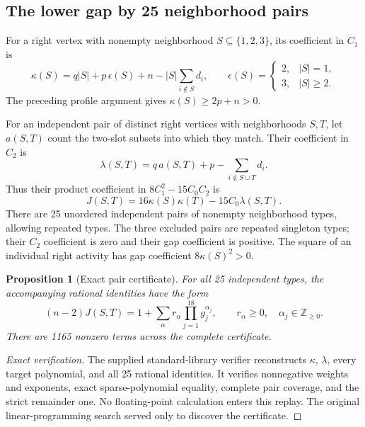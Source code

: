 \documentclass[11pt,a4paper]{article}
\newtheorem{proposition}[theorem]{Proposition}
\theoremstyle{remark}\newtheorem{remark}[theorem]{Remark}
\begin{document}
\subsection{The lower gap by 25 neighborhood pairs}
For a right vertex with nonempty neighborhood $S\subseteq\{1,2,3\}$, its coefficient in $C_1$ is
\begin{equation}\label{mrn:e:mh:eq:kappa}
 \kappa(S)=q|S|+p\,\epsilon(S)+n-|S|\sum_{i\notin S}d_i,
 \qquad
 \epsilon(S)=
 \begin{cases}2,&|S|=1,\\3,&|S|\ge2.\end{cases}
\end{equation}
The preceding profile argument gives $\kappa(S)\ge2p+n>0$.

For an independent pair of distinct right vertices with neighborhoods $S,T$, let $a(S,T)$ count the two-slot subsets into which they match. Their coefficient in $C_2$ is
\[
 \lambda(S,T)=q\,a(S,T)+p-\sum_{i\notin S\cup T}d_i.
\]
Thus their product coefficient in $8C_1^2-15C_0C_2$ is
\begin{equation}\label{mrn:e:mh:eq:J}
 J(S,T)=16\kappa(S)\kappa(T)-15C_0\lambda(S,T).
\end{equation}
There are 25 unordered independent pairs of nonempty neighborhood types, allowing repeated types. The three excluded pairs are repeated singleton types; their $C_2$ coefficient is zero and their gap coefficient is positive. The square of an individual right activity has gap coefficient $8\kappa(S)^2>0$.

\begin{proposition}[Exact pair certificate]\label{mrn:e:mh:prop:certificate}
For all 25 independent types, the accompanying rational identities have the form
\begin{equation}\label{mrn:e:mh:eq:cert}
 (n-2)J(S,T)
 =1+\sum_{\alpha}r_\alpha\prod_{j=1}^{18}g_j^{\alpha_j},
 \qquad r_\alpha\ge0,\quad\alpha_j\in\mathbb Z_{\ge0}.
\end{equation}
There are 1165 nonzero terms across the complete certificate.
\end{proposition}
\begin{proof}[Exact verification]
The supplied standard-library verifier reconstructs $\kappa$, $\lambda$, every target polynomial, and all 25 rational identities. It verifies nonnegative weights and exponents, exact sparse-polynomial equality, complete pair coverage, and the strict remainder one. No floating-point calculation enters this replay. The original linear-programming search served only to discover the certificate.
\end{proof}
\end{document}
